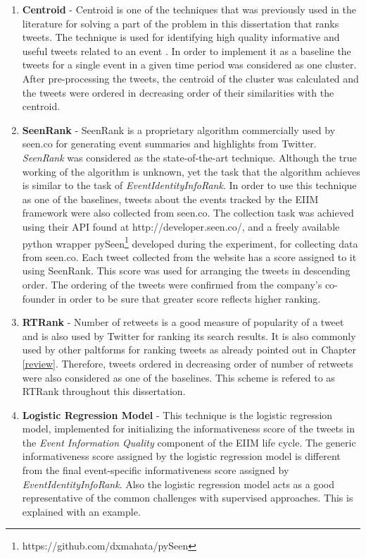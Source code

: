 \begin{enumerate}
\item \textbf{Centroid} - Centroid is one of the techniques that was previously used in the literature for solving a part of the problem in this dissertation that ranks tweets. The technique is used for identifying high quality informative and useful tweets related to an event   \cite{becker2011selecting}. In order to implement it as a baseline the tweets for a single event in a given time period was considered as one cluster. After pre-processing the tweets, the centroid of the cluster was calculated and the tweets were ordered in decreasing order of their similarities with the centroid.

\item \textbf{SeenRank} - SeenRank is a proprietary algorithm commercially used by seen.co for generating event summaries and highlights from Twitter. \textit{SeenRank} was considered as the state-of-the-art technique. Although the true working of the algorithm is unknown, yet the task that the algorithm achieves is similar to the task of \textit{EventIdentityInfoRank}. In order to use this technique as one of the baselines, tweets about the events tracked by the EIIM framework were also collected from seen.co. The collection task was achieved using their API found at http://developer.seen.co/, and a freely available python wrapper pySeen\footnote{https://github.com/dxmahata/pySeen} developed during the experiment, for collecting data from seen.co. Each tweet collected from the website has a score assigned to it using SeenRank. This score was used for arranging the tweets in descending order. The ordering of the tweets were confirmed from the company's co-founder in order to be sure that greater score reflects higher ranking.



\item \textbf{RTRank} - Number of retweets is a good measure of popularity of a tweet and is also used by Twitter for ranking its search results. It is also commonly used by other paltforms for ranking tweets as already pointed out in Chapter \ref{review}. Therefore, tweets ordered in decreasing order of number of retweets were also considered as one of the baselines. This scheme is refered to as RTRank throughout this dissertation.

\item \textbf{Logistic Regression Model} - This technique is the logistic regression model, implemented for initializing the informativeness score of the tweets in the \textit{Event Information Quality} component of the EIIM life cycle. The generic informativeness score assigned by the logistic regression model is different from the final event-specific informativeness score assigned by \textit{EventIdentityInfoRank}. Also the logistic regression model acts as a good representative of the common challenges with supervised approaches. This is explained with an example.



\end{enumerate}
